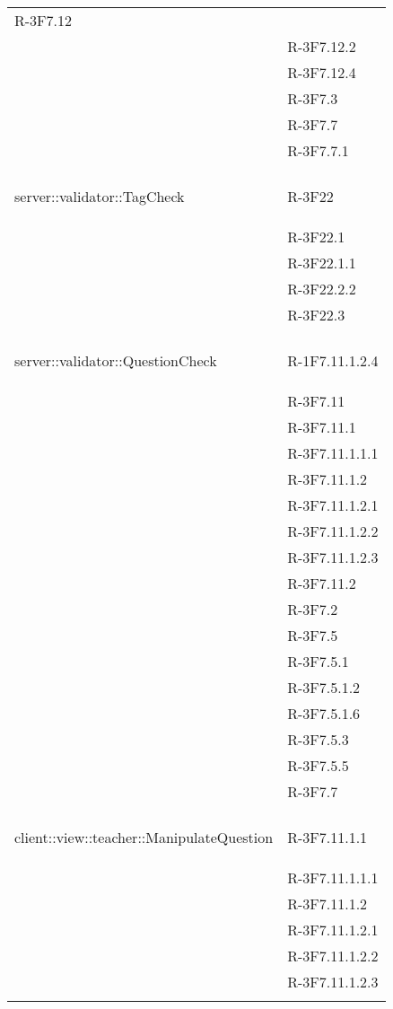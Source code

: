 \begin{longtable}{l p{3cm}}
	R-3F7.12 \tabularnewline &
	
	R-3F7.12.2 \tabularnewline &
	
	R-3F7.12.4 \tabularnewline &
	
	R-3F7.3 \tabularnewline &
	
	R-3F7.7 \tabularnewline &
	
	R-3F7.7.1 \tabularnewline &\tabularnewline
	\hline
	\hypertarget{server::validator::TagCheck}{server::validator::TagCheck} & R-3F22 \tabularnewline &
	
	R-3F22.1 \tabularnewline &
	
	R-3F22.1.1 \tabularnewline &
	
	R-3F22.2.2 \tabularnewline &
	
	R-3F22.3 \tabularnewline &\tabularnewline
	\hline
	\hypertarget{server::validator::QuestionCheck}{server::validator::QuestionCheck} & R-1F7.11.1.2.4 \tabularnewline &
	
	R-3F7.11 \tabularnewline &
	
	R-3F7.11.1 \tabularnewline &
	
	R-3F7.11.1.1.1 \tabularnewline &
	
	R-3F7.11.1.2 \tabularnewline &
	
	R-3F7.11.1.2.1 \tabularnewline &
	
	R-3F7.11.1.2.2 \tabularnewline &
	
	R-3F7.11.1.2.3 \tabularnewline &
	
	R-3F7.11.2 \tabularnewline &
	
	R-3F7.2 \tabularnewline &
	
	R-3F7.5 \tabularnewline &
	
	R-3F7.5.1 \tabularnewline &
	
	R-3F7.5.1.2 \tabularnewline &
	
	R-3F7.5.1.6 \tabularnewline &
	
	R-3F7.5.3 \tabularnewline &
	
	R-3F7.5.5 \tabularnewline &
	
	R-3F7.7 \tabularnewline &\tabularnewline
	\hline
	\hypertarget{client::view::teacher::ManipulateQuestion}{client::view::teacher::ManipulateQuestion} & R-3F7.11.1.1 \tabularnewline &
	
	R-3F7.11.1.1.1 \tabularnewline &
	
	R-3F7.11.1.2 \tabularnewline &
	
	R-3F7.11.1.2.1 \tabularnewline &
	
	R-3F7.11.1.2.2 \tabularnewline &
	
	R-3F7.11.1.2.3 \tabularnewline &
	

\end{longtable}

